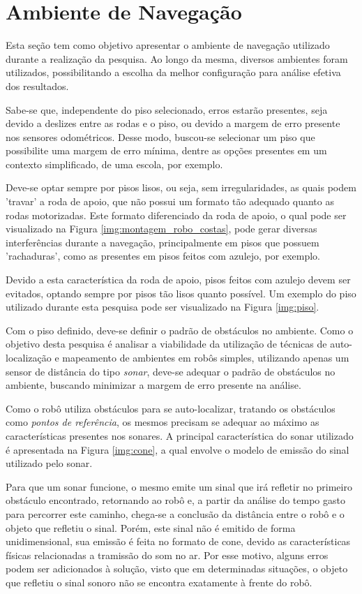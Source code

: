 \section{Ambiente de Navegação}

	Esta seção tem como objetivo apresentar o ambiente de navegação utilizado durante a realização da pesquisa. Ao longo da mesma, diversos ambientes foram utilizados, possibilitando a escolha da melhor configuração para análise efetiva dos resultados.

	Sabe-se que, independente do piso selecionado, erros estarão presentes, seja devido a deslizes entre as rodas e o piso, ou devido a margem de erro presente nos sensores odométricos. Desse modo, buscou-se selecionar um piso que possibilite uma margem de erro mínima, dentre as opções presentes em um contexto simplificado, de uma escola, por exemplo.

	Deve-se optar sempre por pisos lisos, ou seja, sem irregularidades, as quais podem 'travar' a roda de apoio, que não possui um formato tão adequado quanto as rodas motorizadas. Este formato diferenciado da roda de apoio, o qual pode ser visualizado na Figura \ref{img:montagem_robo_costas}, pode gerar diversas interferências durante a navegação, principalmente em pisos que possuem 'rachaduras', como as presentes em pisos feitos com azulejo, por exemplo.

	Devido a esta característica da roda de apoio, pisos feitos com azulejo devem ser evitados, optando sempre por pisos tão lisos quanto possível. Um exemplo do piso utilizado durante esta pesquisa pode ser visualizado na Figura \ref{img:piso}.

	Com o piso definido, deve-se definir o padrão de obstáculos no ambiente. Como o objetivo desta pesquisa é analisar a viabilidade da utilização de técnicas de auto-localização e mapeamento de ambientes em robôs simples, utilizando apenas um sensor de distância do tipo \textit{sonar}, deve-se adequar o padrão de obstáculos no ambiente, buscando minimizar a margem de erro presente na análise.

	Como o robô utiliza obstáculos para se auto-localizar, tratando os obstáculos como \textit{pontos de referência}, os mesmos precisam se adequar ao máximo as características presentes nos sonares. A principal característica do sonar utilizado é apresentada na Figura \ref{img:cone}, a qual envolve o modelo de emissão do sinal utilizado pelo sonar.

	Para que um sonar funcione, o mesmo emite um sinal que irá refletir no primeiro obstáculo encontrado, retornando ao robô e, a partir da análise do tempo gasto para percorrer este caminho, chega-se a conclusão da distância entre o robô e o objeto que refletiu o sinal. Porém, este sinal não é emitido de forma unidimensional, sua emissão é feita no formato de cone, devido as características físicas relacionadas a tramissão do som no ar. Por esse motivo, alguns erros podem ser adicionados à solução, visto que em determinadas situações, o objeto que refletiu o sinal sonoro não se encontra exatamente à frente do robô.

